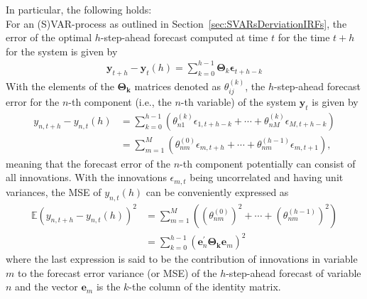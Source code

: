 \documentclass[a4paper,11pt,listof=nochaptergap,oneside,pointednumbers,bibtotoc,bigheadings,liststotoc,hidelinks]{scrbook}
\theoremstyle{mysatz}
\theoremstyle{mydefinition}
\theoremstyle{mytheorem}
\theoremstyle{mybemerkung}
\newcommand{\vect}[1]{\boldsymbol{\mathbf{#1}}}
\begin{document}
In particular, the following holds:\\
For an (S)VAR-process as outlined in Section~\ref{sec:SVARsDerviationIRFs}, the error of the optimal $h$-step-ahead forecast computed at time $t$ for the time $t+h$ for the system is given by 
\begin{equation} \label{eq:FVED1}
\begin{split}
 		\vect{y}_{t+h} - \vect{y}_t(h) = \sum\limits_{k=0}^{h-1} \vect{\Theta}_k\vect{\epsilon}_{t+h-k}
\end{split}								
\end{equation}
With the elements of the $\vect{\Theta_k}$ matrices denoted as $\theta_{ij}^{(k)}$, the $h$-step-ahead forecast error for the $n$-th component (i.e., the $n$-th variable) of the system $\vect{y}_{t}$ is given by 
\begin{equation} \label{eq:FVED2}
\begin{split}
 		y_{n, t+h} - y_{n, t}(h) & = \sum\limits_{k=0}^{h-1} (\theta_{n1}^{(k)}\epsilon_{1, t+h-k} + \cdots + \theta_{nM}^{(k)}\epsilon_{M, t+h-k})\\
						& = \sum\limits_{m=1}^{M} (\theta_{nm}^{(0)}\epsilon_{m, t+h} + \cdots + \theta_{nm}^{(h-1)}\epsilon_{m, t+1}),
\end{split}								
\end{equation}
meaning that the forecast error of the $n$-th component potentially can consist of all innovations. With the innovations $\epsilon_{m,t}$ being uncorrelated and having unit variances, the MSE of $y_{n, t}(h)$ can be conveniently expressed as
\begin{equation} \label{eq:FVED3}
\begin{split}
 		\mathbb{E}(y_{n, t+h} - y_{n, t}(h))^2 & =  \sum\limits_{m=1}^{M} \left((\theta_{nm}^{(0)} )^2+ \cdots + (\theta_{nm}^{(h-1)})^2\right) \\
		& =  \sum\limits_{k=0}^{h-1} (\vect{e}_n^'\vect{\Theta_k}\vect{e}_m)^2
\end{split}								
\end{equation}
where the last expression is said to be the contribution of innovations in variable $m$ to the forecast error variance (or MSE) of the $h$-step-ahead forecast of variable $n$ and the vector $\vect{e}_m$ is the $k$-the column of the identity matrix.
\end{document}
